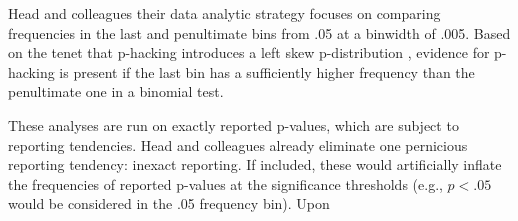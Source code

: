Head and colleagues their data analytic strategy focuses on comparing frequencies in the last and penultimate bins from .05 at a binwidth of .005. Based on the tenet that p-hacking introduces a left skew p-distribution \cite{Simonsohn2014}, evidence for p-hacking is present if the last bin has a sufficiently higher frequency than the penultimate one in a binomial test. 

These analyses are run on exactly reported p-values, which are subject to reporting tendencies. Head and colleagues already eliminate one pernicious reporting tendency: inexact reporting. If included, these would artificially inflate the frequencies of reported p-values at the significance thresholds (e.g., $p<.05$ would be considered in the .05 frequency bin). Upon  